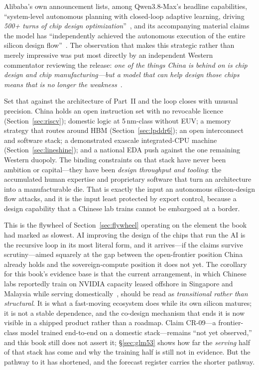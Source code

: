 Alibaba's own announcement lists, among Qwen3.8-Max's headline capabilities, ``system-level autonomous planning with closed-loop adaptive learning, driving \emph{500+ turns of chip design optimization}''~\cite{qwen-announcement}, and its accompanying material claims the model has ``independently achieved the autonomous execution of the entire silicon design flow''~\cite{berman2026}. The observation that makes this strategic rather than merely impressive was put most directly by an independent Western commentator reviewing the release: \emph{one of the things China is behind on is chip design and chip manufacturing---but a model that can help design those chips means that is no longer the weakness}~\cite{berman2026}.

Set that against the architecture of Part~II and the loop closes with unusual precision. China holds an open instruction set with no revocable licence (Section~\ref{sec:riscv}); domestic logic at 5\,nm-class without EUV; a memory strategy that routes around HBM (Section~\ref{sec:lpddr6}); an open interconnect and software stack; a demonstrated exascale integrated-CPU machine (Section~\ref{sec:lineshine}); and a national EDA push against the one remaining Western duopoly. The binding constraints on that stack have never been ambition or capital---they have been \emph{design throughput and tooling}: the accumulated human expertise and proprietary software that turn an architecture into a manufacturable die. That is exactly the input an autonomous silicon-design flow attacks, and it is the input least protected by export control, because a design capability that a Chinese lab trains cannot be embargoed at a border.

This is the flywheel of Section~\ref{sec:flywheel} operating on the element the book had marked as slowest. AI improving the design of the chips that run the AI is the recursive loop in its most literal form, and it arrives---if the claims survive scrutiny---aimed squarely at the gap between the open-frontier position China already holds and the sovereign-compute position it does not yet. The corollary for this book's evidence base is that the current arrangement, in which Chinese labs reportedly train on NVIDIA capacity leased offshore in Singapore and Malaysia while serving domestically~\cite{qwen-offshore}, should be read as \emph{transitional rather than structural}. It is what a fast-moving ecosystem does while its own silicon matures; it is not a stable dependence, and the co-design mechanism that ends it is now visible in a shipped product rather than a roadmap. Claim CR-09---a frontier-class model trained end-to-end on a domestic stack---remains ``not yet observed,'' and this book still does not assert it; \S\ref{sec:glm53} shows how far the \emph{serving} half of that stack has come and why the training half is still not in evidence. But the pathway to it has shortened, and the forecast register carries the shorter pathway.

